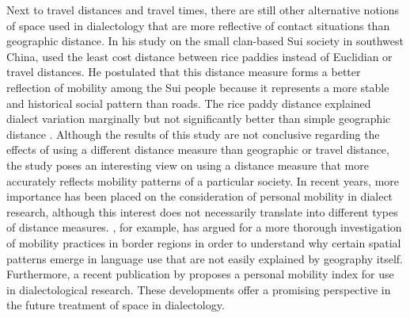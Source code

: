 \documentclass[output=paper,colorlinks,citecolor=brown,draft]{langscibook}
\begin{document}
Next to travel distances and travel times, there are still other alternative notions of space used in dialectology that are more reflective of contact situations than geographic distance. In his study on the small clan-based Sui society in southwest China, \citet{stanford_one_2012} used the least cost distance between rice paddies instead of Euclidian or travel distances. He postulated that this distance measure forms a better reflection of mobility among the Sui people because it represents a more stable and historical social pattern than roads. The rice paddy distance explained dialect variation marginally but not significantly better than simple geographic distance \citep{stanford_one_2012}. Although the results of this study are not conclusive regarding the effects of using a different distance measure than geographic or travel distance, the study poses an interesting view on using a distance measure that more accurately reflects mobility patterns of a particular society. In recent years, more importance has been placed on the consideration of personal mobility in dialect research, although this interest does not necessarily translate into different types of distance measures. \citet{britain_space_2013}, for example, has argued for a more thorough investigation of mobility practices in border regions in order to understand why certain spatial patterns emerge in language use that are not easily explained by geography itself. Furthermore, a recent publication by \citet{JeszenszkyEtAl2024} proposes a personal mobility index for use in dialectological research. These developments offer a promising perspective in the future treatment of space in dialectology. 
\end{document}
